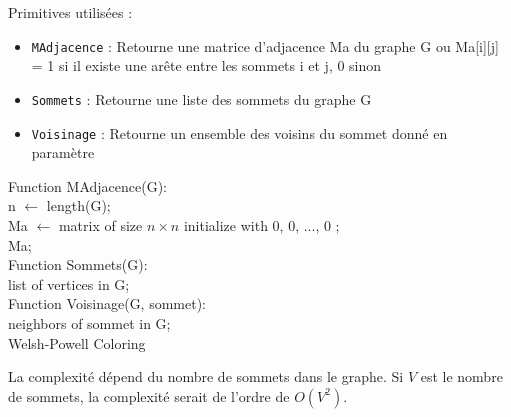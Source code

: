 \documentclass{report}
\begin{document}
\hspace{-4em}Primitives utilisées :
\begin{itemize}
  \item \texttt{MAdjacence} : Retourne une matrice d'adjacence Ma du graphe G ou Ma[i][j] = 1 si il existe une arête entre les sommets i et j, 0 sinon
  \item \texttt{Sommets} : Retourne une liste des sommets du graphe G
  \item \texttt{Voisinage} : Retourne un ensemble des voisins du sommet donné en paramètre
\end{itemize}
\begin{algorithm}[H]

    \SetAlgoLined
    \SetNoFillComment
    Function MAdjacence(G):\\ 
    \hspace{2em} n $\leftarrow$ length(G);\\
    \hspace{2em} Ma $\leftarrow$ matrix of size $n \times n$ initialize with  {0, 0, ..., 0} ;\\
    \hspace{2em} 
        \hspace{2em}\Return Ma;\\

    Function Sommets(G):\\
    \hspace{2em}\Return list of vertices in G;\\
    Function Voisinage(G, sommet):\\
    \hspace{2em}\Return neighbors of sommet in G;\\
    \caption{Welsh-Powell Coloring}

\end{algorithm}
\begin{note}
    \item La complexité dépend du nombre de sommets dans le graphe. Si $V$ est le nombre de sommets, la complexité serait de l'ordre de $O(V^2)$.
\end{note}
\end{document}
